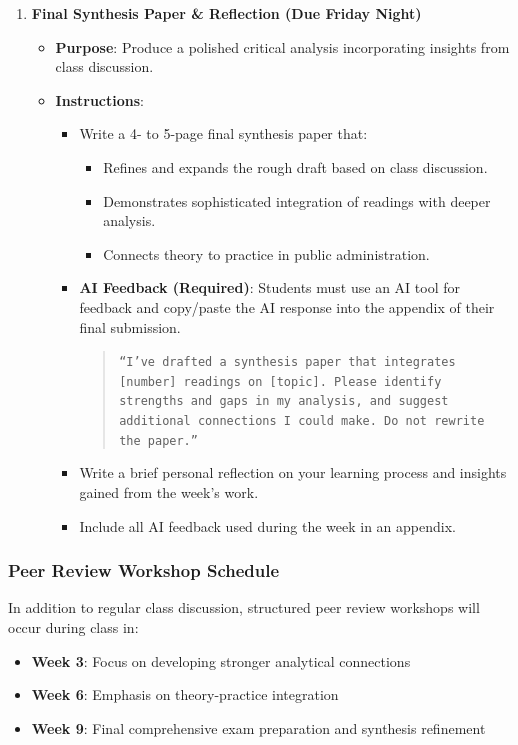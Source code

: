 \documentclass[12pt, letterpaper]{article}
\begin{document}
\begin{enumerate}
    \item \textbf{Final Synthesis Paper \& Reflection (Due Friday Night)}
    \begin{itemize}
        \item \textbf{Purpose}: Produce a polished critical analysis incorporating insights from class discussion.
        \item \textbf{Instructions}:
        \begin{itemize}
            \item Write a 4- to 5-page final synthesis paper that:
            \begin{itemize}
                \item Refines and expands the rough draft based on class discussion.
                \item Demonstrates sophisticated integration of readings with deeper analysis.
                \item Connects theory to practice in public administration.
            \end{itemize}
            \item \textbf{AI Feedback (Required)}: Students must use an AI tool for feedback and copy/paste the AI response into the appendix of their final submission.  
            \begin{quote}
                \texttt{``I've drafted a synthesis paper that integrates [number] readings on [topic]. Please identify strengths and gaps in my analysis, and suggest additional connections I could make. Do not rewrite the paper.''}
            \end{quote}
            \item Write a brief personal reflection on your learning process and insights gained from the week's work.
            \item Include all AI feedback used during the week in an appendix.
        \end{itemize}
    \end{itemize}
\end{enumerate}

\subsubsection*{Peer Review Workshop Schedule}

In addition to regular class discussion, structured peer review workshops will occur during class in:
\begin{itemize}
    \item \textbf{Week 3}: Focus on developing stronger analytical connections
    \item \textbf{Week 6}: Emphasis on theory-practice integration
    \item \textbf{Week 9}: Final comprehensive exam preparation and synthesis refinement
\end{itemize}
\end{document}
